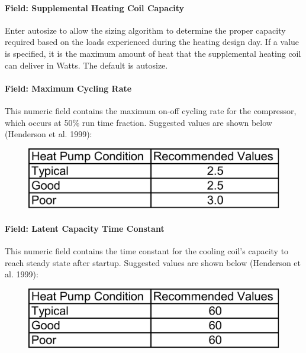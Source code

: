\paragraph{Field: Supplemental Heating Coil Capacity}\label{field-supplemental-heating-coil-capacity-1}

Enter autosize to allow the sizing algorithm to determine the proper capacity required based on the loads experienced during the heating design day. If a value is specified, it is the maximum amount of heat that the supplemental heating coil can deliver in Watts. The default is autosize.

\paragraph{Field: Maximum Cycling Rate}\label{field-maximum-cycling-rate-000}

This numeric field contains the maximum on-off cycling rate for the compressor, which occurs at 50\% run time fraction. Suggested values are shown below (Henderson et al. 1999):

\begin{figure}[htbp]
\centering
\includegraphics{media/image605.png}
\caption{}
\end{figure}

\paragraph{Field: Latent Capacity Time Constant}\label{field-heat-pump-time-constant}

This numeric field contains the time constant for the cooling coil's capacity to reach steady state after startup. Suggested values are shown below (Henderson et al. 1999):

\begin{figure}[htbp]
\centering
\includegraphics{media/image606.png}
\caption{}
\end{figure}

